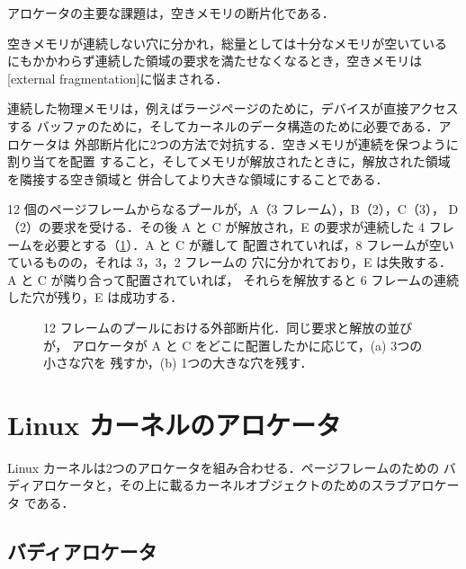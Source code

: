 \documentclass[../main.tex]{subfiles}
\begin{document}
アロケータの主要な課題は，空きメモリの断片化である．

\begin{definition}[外部断片化]
  空きメモリが連続しない穴に分かれ，総量としては十分なメモリが空いている
  にもかかわらず連続した領域の要求を満たせなくなるとき，空きメモリは
  [external fragmentation]に悩まされる．
\end{definition}

連続した物理メモリは，例えばラージページのために，デバイスが直接アクセスする
バッファのために，そしてカーネルのデータ構造のために必要である．アロケータは
外部断片化に2つの方法で対抗する．空きメモリが連続を保つように割り当てを配置
すること，そしてメモリが解放されたときに，解放された領域を隣接する空き領域と
併合してより大きな領域にすることである．

\begin{example}
  \label{ex:l08-fragmentation}
  12 個のページフレームからなるプールが，A（3 フレーム），B（2），C（3），
  D（2）の要求を受ける．その後 A と C が解放され，E の要求が連続した 4
  フレームを必要とする（\cref{fig:l08-fragmentation}）．A と C が離して
  配置されていれば，8 フレームが空いているものの，それは 3，3，2 フレームの
  穴に分かれており，E は失敗する．A と C が隣り合って配置されていれば，
  それらを解放すると 6 フレームの連続した穴が残り，E は成功する．
\end{example}

\begin{figure}[htbp]
  \centering
  
  \caption{12 フレームのプールにおける外部断片化．同じ要求と解放の並びが，
    アロケータが A と C をどこに配置したかに応じて，(a) 3つの小さな穴を
    残すか，(b) 1つの大きな穴を残す．}
  \label{fig:l08-fragmentation}
\end{figure}

\section{Linux カーネルのアロケータ}
\label{sec:l08-linux-allocators}

Linux カーネルは2つのアロケータを組み合わせる．ページフレームのための
バディアロケータと，その上に載るカーネルオブジェクトのためのスラブアロケータ
である．

\subsection{バディアロケータ}
\end{document}
